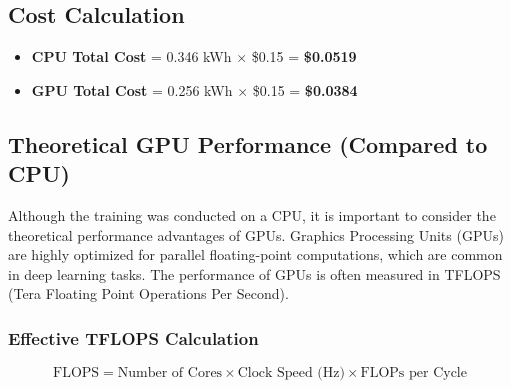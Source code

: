 
\subsection{Cost Calculation}

\begin{itemize}
    \item \textbf{CPU Total Cost} = 0.346 kWh $\times$ \$0.15 = \textbf{\$0.0519}
    \item \textbf{GPU Total Cost} = 0.256 kWh $\times$ \$0.15 = \textbf{\$0.0384}
\end{itemize}


\subsection{Theoretical GPU Performance (Compared to CPU)}

Although the training was conducted on a CPU, it is important to consider the theoretical 
performance advantages of GPUs. Graphics Processing Units (GPUs) are highly optimized for parallel 
floating-point computations, which are common in deep learning tasks. The performance of GPUs is 
often measured in TFLOPS (Tera Floating Point Operations Per Second).


\subsubsection*{Effective TFLOPS Calculation} 

\[
\text{FLOPS} = \text{Number of Cores} \times \text{Clock Speed (Hz)} \times \text{FLOPs per Cycle}
\]

